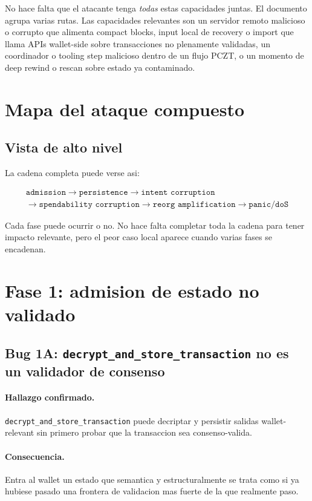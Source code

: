 \documentclass[11pt,a4paper]{article}
\begin{document}
No hace falta que el atacante tenga \emph{todas} estas capacidades juntas.
El documento agrupa varias rutas. Las capacidades relevantes son un servidor
remoto malicioso o corrupto que alimenta compact blocks, input local de
recovery o import que llama APIs wallet-side sobre transacciones no plenamente
validadas, un coordinador o tooling step malicioso dentro de un flujo PCZT, o
un momento de deep rewind o rescan sobre estado ya contaminado.

\section{Mapa del ataque compuesto}

\subsection{Vista de alto nivel}

La cadena completa puede verse asi:

\[
\begin{array}{c}
\texttt{admission}
\rightarrow
\texttt{persistence}
\rightarrow
\texttt{intent\ corruption}
\\[0.3em]
\rightarrow
\texttt{spendability\ corruption}
\rightarrow
\texttt{reorg\ amplification}
\rightarrow
\texttt{panic/doS}
\end{array}
\]

Cada fase puede ocurrir o no. No hace falta completar toda la cadena para
tener impacto relevante, pero el peor caso local aparece cuando varias fases se
encadenan.

\section{Fase 1: admision de estado no validado}

\subsection{Bug 1A: \texttt{decrypt\_and\_store\_transaction} no es un validador de consenso}

\paragraph{Hallazgo confirmado.}
\texttt{decrypt\_and\_store\_transaction} puede decriptar y persistir salidas
wallet-relevant sin primero probar que la transaccion sea consenso-valida.

\paragraph{Consecuencia.}
Entra al wallet un estado que semantica y estructuralmente se trata como si ya
hubiese pasado una frontera de validacion mas fuerte de la que realmente paso.
\end{document}
